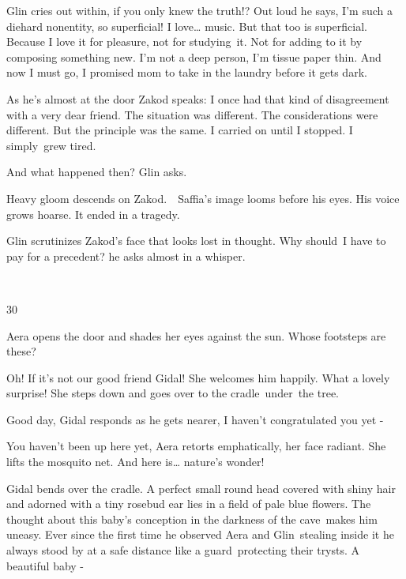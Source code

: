\documentclass[letterpaper]{article}
\begin{document}
Glin cries out within, if you only knew the truth!? Out loud he says, {\textquotedbl}I'm such a diehard nonentity, so
superficial! I love{\dots} music. But that too is superficial. Because I love it for pleasure, not for studying~it. Not
for adding to it by composing something new. I'm not a deep person, I'm tissue paper thin. And now I must go, I
promised mom to take in the laundry before it gets dark.{\textquotedbl} 

As he's almost at the door Zakod speaks: {\textquotedbl}I once had that kind of disagreement with a very dear friend.
The situation was different. The considerations were different. But the principle was the same. I carried on until I
stopped. I simply\textcolor[rgb]{0.0,0.4392157,0.7529412}{\ }grew tired.{\textquotedbl} 

{\textquotedbl}And what happened then?{\textquotedbl} Glin asks. 

Heavy gloom descends on Zakod.\ \ Saffia's image looms before his eyes. His voice grows hoarse. {\textquotedbl}It ended
in a tragedy.{\textquotedbl} 

Glin scrutinizes Zakod's face that looks lost in thought. {\textquotedbl}Why
should\textcolor[rgb]{0.0,0.4392157,0.7529412}{\ }I have to pay for a precedent?{\textquotedbl} he asks almost in a
whisper.

~

30~~ 

Aera opens the door and shades her eyes against the sun. Whose footsteps are these? 

{\textquotedbl}Oh! If it's not our good friend Gidal!{\textquotedbl} She welcomes him happily. {\textquotedbl}What a
lovely surprise!{\textquotedbl} She steps down and goes over to the
cradle~under\textcolor[rgb]{0.0,0.4392157,0.7529412}{\ }the tree. 

{\textquotedbl}Good day,{\textquotedbl} Gidal responds as he gets nearer, {\textquotedbl}I haven't congratulated you yet
-{\textquotedbl} 

{\textquotedbl}You haven't been up here yet,{\textquotedbl} Aera retorts emphatically, her face radiant. She lifts the
mosquito net. {\textquotedbl}And here is{\dots} nature's wonder!{\textquotedbl} 

Gidal bends over the cradle. A perfect small round head covered with shiny hair and adorned with a tiny rosebud ear lies
in a field of pale blue flowers. The thought about this baby's conception in the darkness of the cave\ makes him
uneasy. Ever since the first time he observed Aera and Glin~stealing inside it he always stood by at a safe distance
like a guard\ protecting their trysts. {\textquotedbl}A beautiful baby -{\textquotedbl} 
\end{document}
